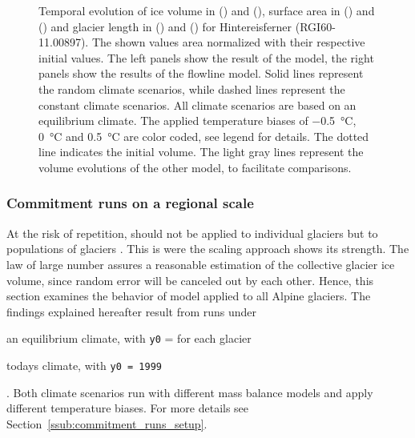 \begin{figure}[p]
          \caption{Temporal evolution of ice volume in () and (), surface area in () and () and glacier length in () and () for Hintereisferner (RGI60-11.00897). The shown values area normalized with their respective initial values. The left panels show the result of the \vas{} model, the right panels show the results of the flowline model. Solid lines represent the random climate scenarios, while dashed lines represent the constant climate scenarios. All climate scenarios are based on an equilibrium climate. The applied temperature biases of \SI{-.5}{\celsius}, \SI{0}{\celsius} and \SI{+.5}{\celsius} are color coded, see legend for details. The dotted line indicates the initial volume. The light gray lines represent the volume evolutions of the other model, to facilitate comparisons.}
          \label{fig:hintereisferner}
        \end{figure}
      

      \subsubsection{Commitment runs on a regional scale} %
      \label{ssub:commitment_runs_results}

        At the risk of repetition, \vas{} should not be applied to individual glaciers but to populations of glaciers \citep{Bahr2015}. This is were the scaling approach shows its strength. The law of large number assures a reasonable estimation of the collective glacier ice volume, since random error will be canceled out by each other. Hence, this section examines the behavior of \vas{} model applied to all Alpine glaciers. The findings explained hereafter result from runs under
        \begin{enumerate*}[label=(\alph*)]
          \item an equilibrium climate, with \lstinline`y0` = \tstar{} for each glacier
          \item todays climate, with \lstinline`y0 = 1999`
        \end{enumerate*}.
        Both climate scenarios run with different mass balance models and apply different temperature biases. For more details see Section~\ref{ssub:commitment_runs_setup}.

